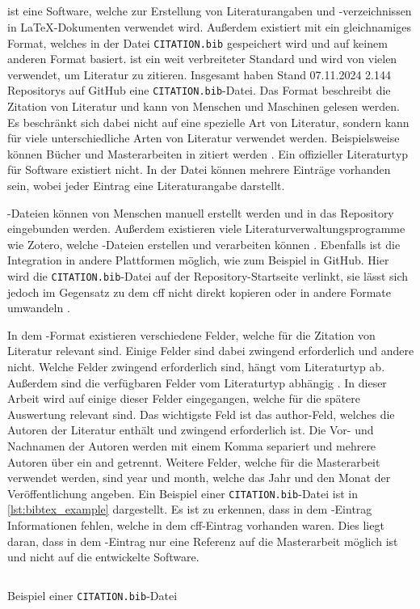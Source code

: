 \subsection{}
\label{subsec:bibtex_format}
 ist eine Software, welche zur Erstellung von Literaturangaben und -verzeichnissen in \LaTeX{}-Dokumenten verwendet wird.
Außerdem existiert mit  ein gleichnamiges Format, welches in der Datei \texttt{CITATION.bib} gespeichert wird und auf keinem anderen Format basiert.
 ist ein weit verbreiteter Standard und wird von vielen verwendet, um Literatur zu zitieren.
Insgesamt haben Stand 07.11.2024 2.144 Repositorys auf GitHub eine \texttt{CITATION.bib}-Datei.
Das Format beschreibt die Zitation von Literatur und kann von Menschen und Maschinen gelesen werden.
Es beschränkt sich dabei nicht auf eine spezielle Art von Literatur, sondern kann für viele unterschiedliche Arten von Literatur verwendet werden.
Beispielsweise können Bücher und Masterarbeiten in  zitiert werden \autocite{patashnik_bibtexing_1988}.
Ein offizieller Literaturtyp für Software existiert nicht.
In der Datei können mehrere Einträge vorhanden sein, wobei jeder Eintrag eine Literaturangabe darstellt.

-Dateien können von Menschen manuell erstellt werden und in das Repository eingebunden werden.
Außerdem existieren viele Literaturverwaltungsprogramme wie Zotero, welche -Dateien erstellen und verarbeiten können \autocite{zotero_zotero_2024}.
Ebenfalls ist die Integration in andere Plattformen möglich, wie zum Beispiel in GitHub.
Hier wird die \texttt{CITATION.bib}-Datei auf der Repository-Startseite verlinkt, sie lässt sich jedoch im Gegensatz zu dem \gls{cff} nicht direkt kopieren oder in andere Formate umwandeln \autocite{github_about_2024-2}.

In dem -Format existieren verschiedene Felder, welche für die Zitation von Literatur relevant sind.
Einige Felder sind dabei zwingend erforderlich und andere nicht.
Welche Felder zwingend erforderlich sind, hängt vom Literaturtyp ab.
Außerdem sind die verfügbaren Felder vom Literaturtyp abhängig \autocite{patashnik_bibtexing_1988}.
In dieser Arbeit wird auf einige dieser Felder eingegangen, welche für die spätere Auswertung relevant sind.
Das wichtigste Feld ist das \glqq author\grqq{}-Feld, welches die Autoren der Literatur enthält und zwingend erforderlich ist.
Die Vor- und Nachnamen der Autoren werden mit einem Komma separiert und mehrere Autoren über ein \glqq and\grqq{} getrennt.
Weitere Felder, welche für die Masterarbeit verwendet werden, sind \glqq year\grqq{} und \glqq month\grqq{}, welche das Jahr und den Monat der Veröffentlichung angeben.
Ein Beispiel einer \texttt{CITATION.bib}-Datei ist in \autoref{lst:bibtex_example} dargestellt.
Es ist zu erkennen, dass in dem -Eintrag Informationen fehlen, welche in dem \gls{cff}-Eintrag vorhanden waren.
Dies liegt daran, dass in dem -Eintrag nur eine Referenz auf die Masterarbeit möglich ist und nicht auf die entwickelte Software.

\begin{listing}
  \inputminted{text}{../CITATION.bib}
  \caption{Beispiel einer \texttt{CITATION.bib}-Datei}
  \label{lst:bibtex_example}
\end{listing}
